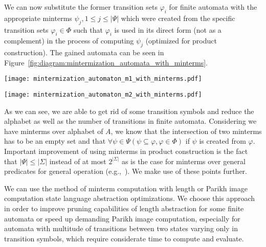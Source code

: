 We can now substitute the former transition sets $\varphi_i$ for finite automata with the appropriate minterms $\psi_j, 1 \leq j \leq |\Psi|$ which were created from the specific transition sets $\varphi_i \in \Phi$ such that $\varphi_i$ is used in its direct form (not as a complement) in the process of computing $\psi_j$ (optimized for product construction). The gained automata can be seen in Figure~\ref{fig:diagram:mintermization_automata_with_minterms}.

\begin{figure*}[ht]
    \centering
    \begin{minipage}{0.47\linewidth}
        \centering
        \texttt{[image: mintermization\_automaton\_m1\_with\_minterms.pdf]}
        \caption{Finite automaton $A_1$ with transitions substituted by corresponding minterms $\psi_i \in \Psi$ created from these transition sets.}
        \label{fig:diagram:mintermization_automaton_m1_with_minterms}
    \end{minipage}
    \hfill
    \begin{minipage}{0.47\linewidth}
        \centering
        \texttt{[image: mintermization\_automaton\_m2\_with\_minterms.pdf]}
        \caption{Finite automaton $A_2$ with transitions substituted by corresponding minterms $\psi_i \in \Psi$ created from these transition sets.}
        \label{fig:diagram:mintermization_automaton_m2_with_minterms}
    \end{minipage}
    \vspace{0.5cm}
    \caption{Finite automata $A_1$ and $A_2$ with substituted transitions with minterms in the process of mintermization.}
    \label{fig:diagram:mintermization_automata_with_minterms}
\end{figure*}

As we can see, we are able to get rid of some transition symbols and reduce the alphabet as well as the number of transitions in finite automata. Considering we have minterms over alphabet of $A$, we know that the intersection of two minterms has to be an empty set and that $\forall \psi \in \Psi ( \psi \subseteq \varphi, \varphi \in \Phi )$ if $\psi$ is created from $\varphi$. Important improvement of using minterms in product construction is the fact that $|\Psi| \leq |\Sigma|$ instead of at most $2^{|\Sigma|}$ as is the case for minterms over general predicates for general operation (e.g.,~\cite{minterms_forms-FITPUB11801}). We make use of these points further.

We can use the method of minterm computation with length or Parikh image computation state language abstraction optimizations. We choose this approach in order to improve pruning capabilities of length abstraction for some finite automata or speed up demanding Parikh image computation, especially for automata with multitude of transitions between two states varying only in transition symbols, which require considerate time to compute and evaluate.

